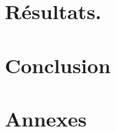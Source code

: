 \documentclass[12pt,fleqn]{report} %
\begin{document}

\part{Résultats.}


\part*{Conclusion}




\appendix
\part{Annexes}



%
\nocite{*}
{\small}




\end{document}
